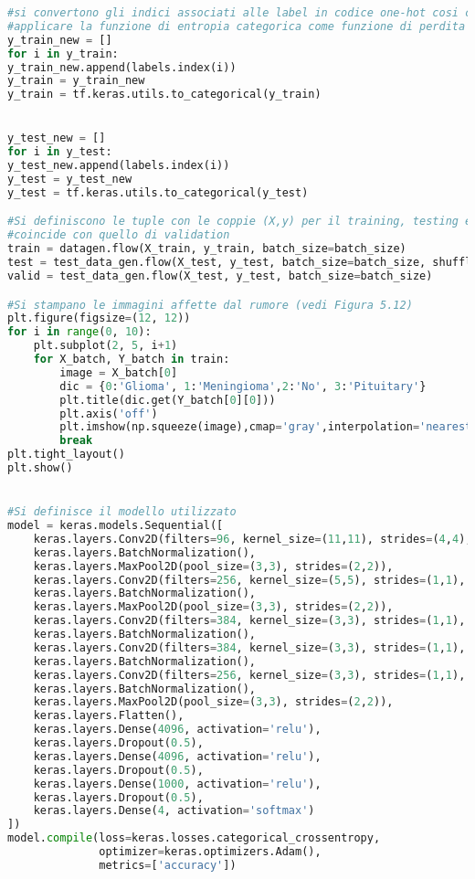 \begin{lstlisting}[basicstyle=\tiny, language=Python, caption=Esempio di implementazione di AlexNet per la classificazione di RM con l'aggiunta di rumore al set di training.~\cite{dsbrain} ]
#si convertono gli indici associati alle label in codice one-hot cosi che si possa 
#applicare la funzione di entropia categorica come funzione di perdita
y_train_new = []
for i in y_train:
y_train_new.append(labels.index(i))
y_train = y_train_new
y_train = tf.keras.utils.to_categorical(y_train)


y_test_new = []
for i in y_test:
y_test_new.append(labels.index(i))
y_test = y_test_new
y_test = tf.keras.utils.to_categorical(y_test)

#Si definiscono le tuple con le coppie (X,y) per il training, testing e validation, dove in questo caso il set di testing 
#coincide con quello di validation
train = datagen.flow(X_train, y_train, batch_size=batch_size)
test = test_data_gen.flow(X_test, y_test, batch_size=batch_size, shuffle=False)
valid = test_data_gen.flow(X_test, y_test, batch_size=batch_size)

#Si stampano le immagini affette dal rumore (vedi Figura 5.12)
plt.figure(figsize=(12, 12))
for i in range(0, 10):
    plt.subplot(2, 5, i+1)
    for X_batch, Y_batch in train:
        image = X_batch[0]        
        dic = {0:'Glioma', 1:'Meningioma',2:'No', 3:'Pituitary'}
        plt.title(dic.get(Y_batch[0][0]))
        plt.axis('off')  
        plt.imshow(np.squeeze(image),cmap='gray',interpolation='nearest')
        break
plt.tight_layout()
plt.show()


#Si definisce il modello utilizzato
model = keras.models.Sequential([
    keras.layers.Conv2D(filters=96, kernel_size=(11,11), strides=(4,4), activation='relu', input_shape=(image_size,image_size,3)),
    keras.layers.BatchNormalization(),
    keras.layers.MaxPool2D(pool_size=(3,3), strides=(2,2)),
    keras.layers.Conv2D(filters=256, kernel_size=(5,5), strides=(1,1), activation='relu', padding="same"),
    keras.layers.BatchNormalization(),
    keras.layers.MaxPool2D(pool_size=(3,3), strides=(2,2)),
    keras.layers.Conv2D(filters=384, kernel_size=(3,3), strides=(1,1), activation='relu', padding="same"),
    keras.layers.BatchNormalization(),
    keras.layers.Conv2D(filters=384, kernel_size=(3,3), strides=(1,1), activation='relu', padding="same"),
    keras.layers.BatchNormalization(),
    keras.layers.Conv2D(filters=256, kernel_size=(3,3), strides=(1,1), activation='relu', padding="same"),
    keras.layers.BatchNormalization(),
    keras.layers.MaxPool2D(pool_size=(3,3), strides=(2,2)),
    keras.layers.Flatten(),
    keras.layers.Dense(4096, activation='relu'),
    keras.layers.Dropout(0.5),
    keras.layers.Dense(4096, activation='relu'),
    keras.layers.Dropout(0.5), 
    keras.layers.Dense(1000, activation='relu'),
    keras.layers.Dropout(0.5),
    keras.layers.Dense(4, activation='softmax')
])
model.compile(loss=keras.losses.categorical_crossentropy,
              optimizer=keras.optimizers.Adam(),
              metrics=['accuracy'])


\end{lstlisting}
